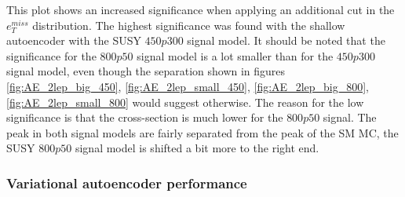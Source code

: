 This plot shows an increased significance when applying an additional cut in the $e_T^{miss}$ distribution.
The highest significance was found with the shallow autoencoder with the SUSY $450p300$ signal model. 
It should be noted that the significance 
for the $800p50$ signal model is a lot smaller than for the $450p300$ signal model, even though the separation 
shown in figures \ref{fig:AE_2lep_big_450}, \ref{fig:AE_2lep_small_450}, \ref{fig:AE_2lep_big_800}, 
\ref{fig:AE_2lep_small_800} would suggest otherwise. The reason for the low significance is that the cross-section is 
much lower for the $800p50$ signal. The peak in both signal models are fairly 
separated from the peak of the SM MC, the SUSY $800p50$ signal model is shifted a bit more to the right end. 

\par

\subsubsection*{Variational autoencoder performance}

